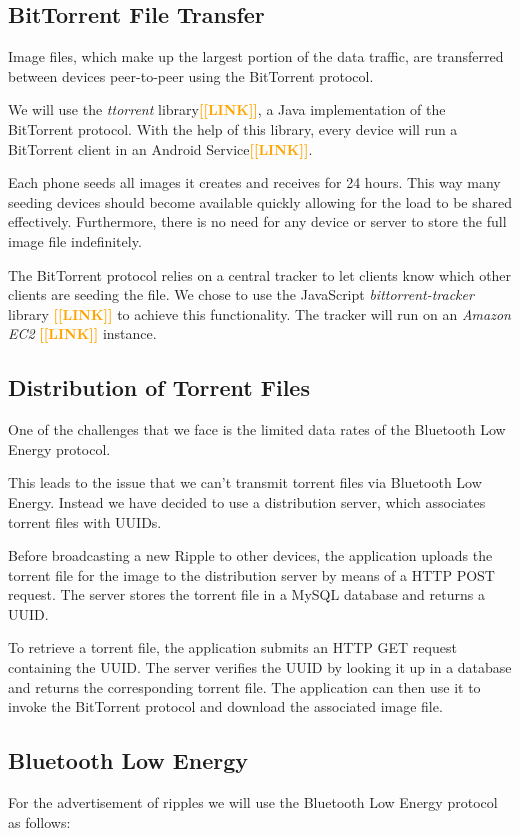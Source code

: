\documentclass{report}
\newcommand{\todo}[1]{\textsf{\textbf{\textcolor{orange}{[[#1]]}}}}
\begin{document}
\subsection{BitTorrent File Transfer}
Image files, which make up the largest portion of the data traffic, are transferred between devices peer-to-peer using the BitTorrent protocol.

We will use the \textit{ttorrent} library\todo{LINK}, a Java implementation of the BitTorrent protocol. With the help of this library, every device will run a BitTorrent client in an Android Service\todo{LINK}.

Each phone seeds all images it creates and receives for 24 hours. This way many seeding devices should become available quickly allowing for the load to be shared effectively. Furthermore, there is no need for any device or server to store the full image file indefinitely.

The BitTorrent protocol relies on a central tracker to let clients know which other clients are seeding the file. We chose to use the JavaScript \textit{bittorrent-tracker} library \todo{LINK} to achieve this functionality. The tracker will run on an \textit{Amazon EC2} \todo{LINK} instance.

\subsection{Distribution of Torrent Files}
One of the challenges that we face is the limited data rates of the Bluetooth Low Energy protocol.

This leads to the issue that we can't transmit torrent files via Bluetooth Low Energy. Instead we have decided to use a distribution server, which associates torrent files with UUIDs.

Before broadcasting a new Ripple to other devices, the application uploads the torrent file for the image to the distribution server by means of a HTTP POST request. The server stores the torrent file in a MySQL database and returns a UUID. 

To retrieve a torrent file, the application submits an HTTP GET request containing the UUID. The server verifies the UUID by looking it up in a database and returns the corresponding torrent file. The application can then use it to invoke the BitTorrent protocol and download the associated image file.

\subsection{Bluetooth Low Energy}
For the advertisement of ripples we will use the Bluetooth Low Energy protocol as follows:
\end{document}
